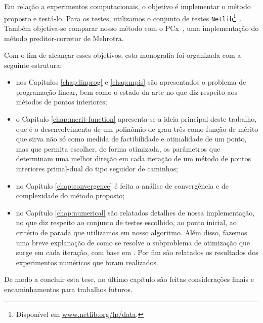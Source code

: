 Em relação a experimentos computacionais, o objetivo é implementar o método proposto e testá-lo. Para os testes, utilizamos o conjunto de testes \texttt{Netlib}\footnote{Disponível em \url{www.netlib.org/lp/data}.}~\cite{Dongarra:1987jk,Gay:1985ts}. Também objetiva-se comparar nosso método com o PCx~\cite{Czyzyk:1999hk}, uma implementação do método preditor-corretor de Mehrotra. 



Com o fim de alcançar  esses objetivos, esta monografia foi organizada com a seguinte estrutura: 

\begin{itemize}

	\item nos Capítulos \ref{chap:linprog} e  \ref{chap:mpis} são apresentados o problema de programação linear, bem como o estado da arte no que diz respeito aos métodos de pontos interiores; 
\item o Capítulo \ref{chap:merit-function} apresenta-se a ideia principal deste trabalho, que é o
desenvolvimento de um polinômio de grau três como função de mérito  que sirva não só como medida
de factibilidade e otimalidade de um ponto, mas que permita escolher, de forma
otimizada, os parâmetros que determinam uma melhor direção em cada iteração
de um método de pontos interiores primal-dual do tipo seguidor de caminhos; 
\item no Capítulo \ref{chap:convergence} é feita a análise de convergência e de complexidade do método proposto; 
\item no Capítulo \ref{chap:numerical} são relatados detalhes de nossa implementação, no que diz respeito ao conjunto de testes escolhido, ao ponto inicial, ao critério de parada que utilizamos em nosso algoritmo. Além disso, fazemos uma breve explanação de como se resolve o subproblema de otimização que surge em cada iteração, com base em \cite{VillasBoas2013:wn,VillasBoas:2003tg,VillasBoas:2012ur}. Por fim são relatados os resultados dos experimentos numéricos que foram realizados.


\end{itemize}

 De modo a  concluir esta tese, no último capítulo são feitas considerações finais e encaminhamentos para trabalhos futuros.

